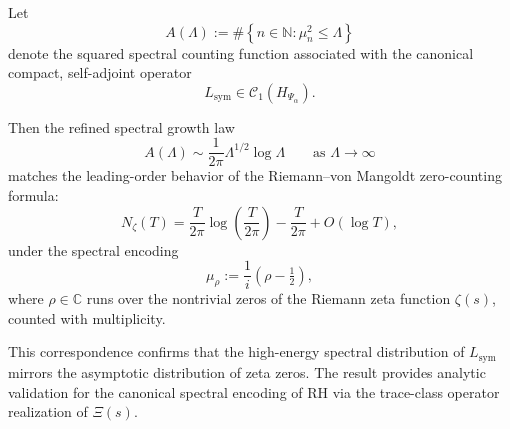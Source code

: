 \begin{corollary}
\label{cor:zeta_compatibility}
Let
\[
A(\Lambda) := \#\left\{ n \in \mathbb{N} : \mu_n^2 \le \Lambda \right\}
\]
denote the squared spectral counting function associated with the canonical compact, self-adjoint operator
\[
L_{\mathrm{sym}} \in \mathcal{C}_1(H_{\Psi_\alpha}).
\]

Then the refined spectral growth law
\[
A(\Lambda) \sim \frac{1}{2\pi} \Lambda^{1/2} \log \Lambda \qquad \text{as } \Lambda \to \infty
\]
matches the leading-order behavior of the Riemann–von Mangoldt zero-counting formula:
\[
N_\zeta(T) = \frac{T}{2\pi} \log\left( \frac{T}{2\pi} \right) - \frac{T}{2\pi} + O(\log T),
\]
under the spectral encoding
\[
\mu_\rho := \frac{1}{i} \left( \rho - \tfrac{1}{2} \right),
\]
where \( \rho \in \mathbb{C} \) runs over the nontrivial zeros of the Riemann zeta function \( \zeta(s) \), counted with multiplicity.

\medskip
\noindent
This correspondence confirms that the high-energy spectral distribution of \( L_{\mathrm{sym}} \) mirrors the asymptotic distribution of zeta zeros. The result provides analytic validation for the canonical spectral encoding of RH via the trace-class operator realization of \( \Xi(s) \).
\end{corollary}
